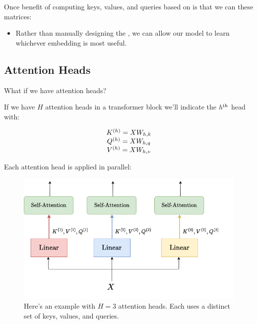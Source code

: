         \begin{concept}
            Once benefit of computing keys, values, and queries based on  is that we can  these matrices: 

            \begin{itemize}
                \item Rather than manually designing the , we can allow our model to learn whichever embedding is most useful.
            \end{itemize}
        \end{concept}

    \phantom{}

    \subsection{Attention Heads}

        What if we have  attention heads?\\

        \begin{notation}
            If we have $H$ attention heads in a transformer block we'll indicate the $h^{ \text{th} }$ head with:

            $$
            \begin{matrix}
                K^{(h)} = XW_{h,k} \\
                Q^{(h)} = XW_{h,q} \\ 
                V^{(h)} = XW_{h,v} 
            \end{matrix}$$
        \end{notation}

        Each attention head is applied in parallel:

        \begin{figure}[H]
            \centering
            \includegraphics[width=0.5\linewidth]{images/transformers_images/multi_headed_attention.png}
            \caption*{Here's an example with $H=3$ attention heads. Each uses a distinct set of keys, values, and queries.}
        \end{figure}

